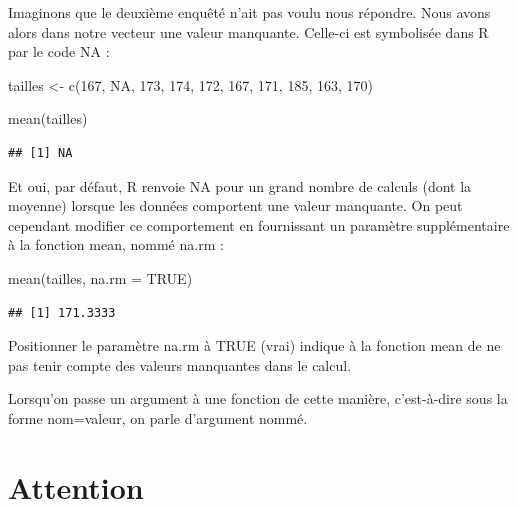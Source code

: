 \documentclass[
]{book}
\newenvironment{Shaded}{\begin{snugshade}}{\end{snugshade}}
\newcommand{\AttributeTok}[1]{\textcolor[rgb]{0.77,0.63,0.00}{#1}}
\newcommand{\ConstantTok}[1]{\textcolor[rgb]{0.00,0.00,0.00}{#1}}
\newcommand{\DecValTok}[1]{\textcolor[rgb]{0.00,0.00,0.81}{#1}}
\newcommand{\FunctionTok}[1]{\textcolor[rgb]{0.00,0.00,0.00}{#1}}
\newcommand{\NormalTok}[1]{#1}
\newcommand{\OtherTok}[1]{\textcolor[rgb]{0.56,0.35,0.01}{#1}}
\begin{document}
Imaginons que le deuxième enquêté n'ait pas voulu nous répondre. Nous avons alors dans notre vecteur une valeur manquante. Celle-ci est symbolisée dans R par le code NA :

\begin{Shaded}
\begin{Highlighting}[]
\NormalTok{tailles }\OtherTok{\textless{}{-}} \FunctionTok{c}\NormalTok{(}\DecValTok{167}\NormalTok{, }\ConstantTok{NA}\NormalTok{, }\DecValTok{173}\NormalTok{, }\DecValTok{174}\NormalTok{, }\DecValTok{172}\NormalTok{, }\DecValTok{167}\NormalTok{, }\DecValTok{171}\NormalTok{, }\DecValTok{185}\NormalTok{, }\DecValTok{163}\NormalTok{, }\DecValTok{170}\NormalTok{)}
\end{Highlighting}
\end{Shaded}

\begin{Shaded}
\begin{Highlighting}[]
\FunctionTok{mean}\NormalTok{(tailles)}
\end{Highlighting}
\end{Shaded}

\begin{verbatim}
## [1] NA
\end{verbatim}

Et oui, par défaut, R renvoie NA pour un grand nombre de calculs (dont la moyenne) lorsque les données comportent une valeur manquante. On peut cependant modifier ce comportement en fournissant un paramètre supplémentaire à la fonction mean, nommé na.rm :

\begin{Shaded}
\begin{Highlighting}[]
\FunctionTok{mean}\NormalTok{(tailles, }\AttributeTok{na.rm =} \ConstantTok{TRUE}\NormalTok{)}
\end{Highlighting}
\end{Shaded}

\begin{verbatim}
## [1] 171.3333
\end{verbatim}

Positionner le paramètre na.rm à TRUE (vrai) indique à la fonction mean de ne pas tenir compte des valeurs manquantes dans le calcul.

Lorsqu'on passe un argument à une fonction de cette manière, c'est-à-dire sous la forme nom=valeur, on parle d'argument nommé.

\hypertarget{attention}{%
\section{Attention}\label{attention}}
\end{document}
